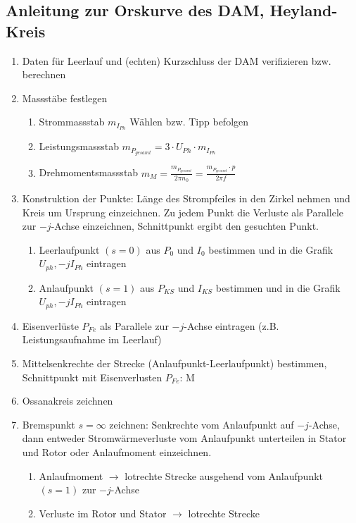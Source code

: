         \newpage
    \subsection{Anleitung zur Orskurve des DAM, Heyland-Kreis}
    \begin{enumerate}
      \item Daten für Leerlauf und (echten) Kurzschluss der DAM verifizieren
      bzw. berechnen
      \item Massstäbe festlegen
      \begin{enumerate}
        \item Strommassstab $m_{I_{Ph}}$ Wählen bzw. Tipp befolgen
        \item Leistungsmassstab $m_{P_{gesamt}}=3\cdot U_{Ph}\cdot m_{I_{Ph}}$
        \item Drehmomentsmassstab $m_M=\frac{m_{P_{gesamt}}}{2\pi n_0} =
        \frac{m_{P_{gesamt}}\cdot p}{2\pi f}$
      \end{enumerate}
      \item Konstruktion der Punkte:
      Länge des Strompfeiles in den Zirkel nehmen und Kreis um Ursprung einzeichnen. Zu jedem Punkt die Verluste als Parallele zur $-j$-Achse einzeichnen, Schnittpunkt ergibt den gesuchten Punkt.
      \begin{enumerate}
      	\item Leerlaufpunkt $(s=0)$ aus $P_0$ und $I_0$ bestimmen und in die Grafik $U_{ph},-jI_{Ph}$ eintragen
        \item Anlaufpunkt $(s=1)$ aus $P_{KS}$ und $I_{KS}$ bestimmen und in die Grafik $U_{ph},-jI_{Ph}$ eintragen
      \end{enumerate}
      \item Eisenverlüste $P_{Fe}$ als Parallele zur $-j$-Achse eintragen (z.B. Leistungsaufnahme im Leerlauf)
      \item Mittelsenkrechte der Strecke (Anlaufpunkt-Leerlaufpunkt) bestimmen, Schnittpunkt mit Eisenverlusten $P_{Fe}$: M
      \item Ossanakreis zeichnen
      \item Bremspunkt $s=\infty$ zeichnen: Senkrechte vom Anlaufpunkt auf $-j$-Achse, dann entweder Stromwärmeverluste vom Anlaufpunkt unterteilen in Stator und Rotor oder Anlaufmoment einzeichnen.
      \begin{enumerate}
        \item Anlaufmoment $\rightarrow$ lotrechte Strecke ausgehend vom Anlaufpunkt $(s=1)$ zur $-j$-Achse
        \item Verluste im Rotor und Stator $\rightarrow$ lotrechte Strecke

\end{enumerate}
\end{enumerate}
